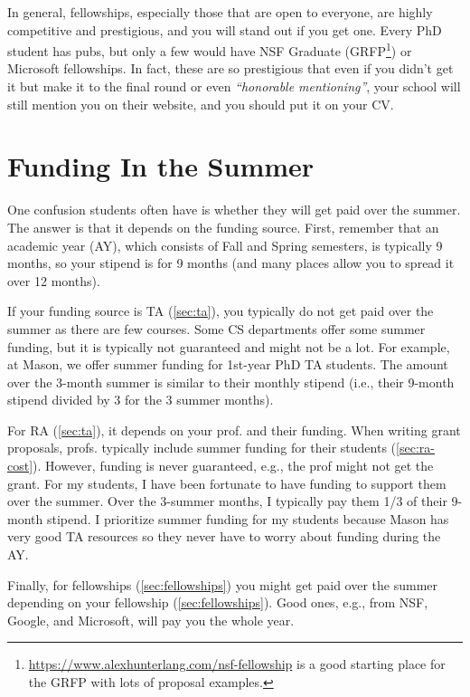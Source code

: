 \documentclass[oneside,11pt,dvipsnames]{book}
\begin{document}
In general, fellowships, especially those that are open to everyone, are highly competitive and prestigious, and you will stand out if you get one.  Every PhD student has pubs, but only a few would have NSF Graduate (GRFP\footnote{\url{https://www.alexhunterlang.com/nsf-fellowship} is a good starting place for the GRFP with lots of proposal examples.}) or Microsoft fellowships. In fact, these are so prestigious that even if you didn't get it but make it to the final round or even \emph{``honorable mentioning''}, your school will still mention you on their website, and you should put it on your CV.


\section{Funding In the Summer}\label{sec:summer-funding}

One confusion students often have is whether they will get paid over the summer.  The answer is that it depends on the funding  source.
First, remember that an academic year (AY), which consists of Fall and Spring semesters, is typically 9 months, so your stipend is for 9 months (and many places allow you to spread it over 12 months).

If your funding source is TA (\autoref{sec:ta}), you typically do not get paid over the summer as there are few courses.
Some CS departments offer some summer funding, but it is typically not guaranteed and might not be a lot. For example, at Mason, we offer summer funding for 1st-year PhD TA students. The amount over the 3-month summer is similar to their monthly stipend (i.e., their 9-month stipend divided by 3 for the 3 summer months).

For RA (\autoref{sec:ta}), it depends on your prof. and their funding. When writing grant proposals, profs. typically include summer funding for their students (\autoref{sec:ra-cost}). However, funding is never guaranteed, e.g., the prof might not get the grant.
For my students, I have been fortunate to have funding to support them over the summer. Over the 3-summer months, I typically pay them 1/3 of their 9-month stipend. I prioritize summer funding for my students because Mason has very good TA resources so they never have to worry about funding during the AY.

Finally, for fellowships (\autoref{sec:fellowships}) you might get paid over the summer depending on your fellowship (\autoref{sec:fellowships}). Good ones, e.g., from NSF, Google, and Microsoft, will pay you the whole year.
\end{document}
